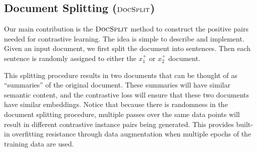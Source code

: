 \documentclass[11pt]{article}
\newcommand{\our}{\mbox{\textsc{DocSplit}}}
\begin{document}
\subsection{Document Splitting ($\our$)}
Our main contribution is the $\our$ method to construct the positive pairs needed for contrastive learning.
The idea is simple to describe and implement.
Given an input document, we first split the document into sentences.
Then each sentence is randomly assigned to either the $x^+_1$ or $x^+_2$ document.

This splitting procedure results in two documents that can be thought of as ``summaries'' of the original document.
These summaries will have similar semantic content,
and the contrastive loss will ensure that these two documents have similar embeddings.
Notice that because there is randomness in the document splitting procedure,
multiple passes over the same data points will result in different contrastive instance pairs being generated.
This provides built-in overfitting resistance through data augmentation when multiple epochs of the training data are used.

\end{document}
